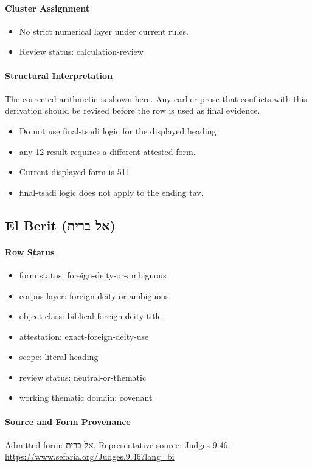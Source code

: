 \paragraph{Cluster Assignment}
\begin{itemize}
\item No strict numerical layer under current rules.
\item Review status: calculation-review
\end{itemize}
\paragraph{Structural Interpretation}
The corrected arithmetic is shown here. Any earlier prose that conflicts with this derivation should be revised before the row is used as final evidence.

\begin{itemize}
\item Do not use final-tsadi logic for the displayed heading
\item any 12 result requires a different attested form.
\item Current displayed form is 511
\item final-tsadi logic does not apply to the ending tav.
\end{itemize}

\subsection{El Berit (אל ברית)}
\paragraph{Row Status}
\begin{itemize}
\item form status: foreign-deity-or-ambiguous
\item corpus layer: foreign-deity-or-ambiguous
\item object class: biblical-foreign-deity-title
\item attestation: exact-foreign-deity-use
\item scope: literal-heading
\item review status: neutral-or-thematic
\item working thematic domain: covenant
\end{itemize}
\paragraph{Source and Form Provenance}
Admitted form: אל ברית.
Representative source: Judges 9:46.
\url{https://www.sefaria.org/Judges.9.46?lang=bi}

